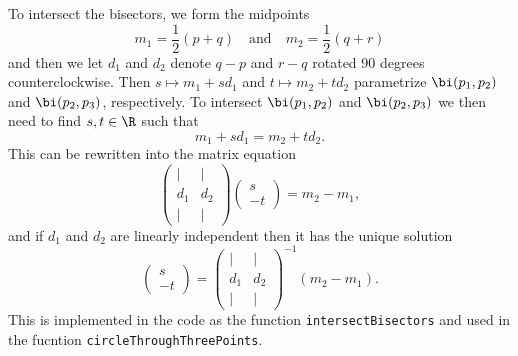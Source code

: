 To intersect the bisectors, we form the midpoints
\[
    m_1 = \frac{1}{2}(p + q) \quad \text{and} \quad m_2 = \frac{1}{2}(q + r)
\]
and then we let $d_1$ and $d_2$ denote $q - p$ and $r - q$ rotated 90 degrees counterclockwise. Then $s \mapsto m_1 + s d_1$ and $t \mapsto m_2 + t d_2$ parametrize $\bi(p_1, p_2)$ and $\bi(p_2, p_3)$, respectively. To intersect $\bi(p_1, p_2)$ and $\bi(p_2, p_3)$ we then need to find $s, t \in \R$ such that
\[
    m_1 + s d_1 = m_2 + t d_2.
\]
This can be rewritten into the matrix equation
\[
    \begin{pmatrix}
        \mid & \mid \\
        d_1 & d_2 \\
        \mid & \mid
    \end{pmatrix} \begin{pmatrix}
        s \\
        -t
    \end{pmatrix}
    =
    m_2 - m_1,
\]
and if $d_1$ and $d_2$ are linearly independent then it has the unique solution
\[
    \begin{pmatrix}
        s \\
        -t
    \end{pmatrix}
    =
    \begin{pmatrix}
        \mid & \mid \\
        d_1 & d_2 \\
        \mid & \mid
    \end{pmatrix}^{-1} (m_2 - m_1).
\]
This is implemented in the code as the function \texttt{intersectBisectors} and used in the fucntion \texttt{circleThroughThreePoints}.

